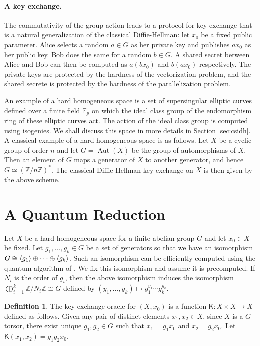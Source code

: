 \documentclass[11pt]{article}
\theoremstyle{plain}
\theoremstyle{definition}
\newtheorem{definition}[theorem]{Definition}
\DeclareMathOperator{\aut}{Aut}
\DeclarePairedDelimiter{\lrang}{\langle}{\rangle}
\def\Z{\mathbb{Z}}
\def\F{\mathbb{F}}
\newcommand{\kex}{\mathsf{K}}
\begin{document}
\paragraph{A key exchange.}
The commutativity of the group action leads to a protocol for key exchange that is a natural 
generalization of the classical Diffie-Hellman: let $x_0$ be a fixed public parameter. Alice selects 
a random $a \in G$ as her private key and publishes $ax_0$ as her public key. Bob does the same for 
a random $b \in G$. A shared secret between Alice and Bob can then be computed as $a(bx_0)$ and 
$b(ax_0)$ respectively. The private keys are protected by the hardness of the vectorization problem, 
and the shared secrete is protected by the hardness of the parallelization problem. 

An example of a hard homogeneous space is a set of supersingular elliptic curves defined over a 
finite field $\F_p$ on which the ideal class group of the endomorphism ring of these elliptic curves 
act. The action of the ideal class group is computed using isogenies. We shall discuss this space in 
more details in Section \ref{sec:csidh}. A classical example of a hard homogeneous space is as 
follows. Let $X$ be a cyclic group of order $n$ and let $G = \aut(X)$ be the group of automorphisms 
of $X$. Then an element of $G$ maps a generator of $X$ to another generator, and hence $G \simeq (\Z 
/ n\Z)^*$. The classical Diffie-Hellman key exchange on $X$ is then given by the above scheme.





\section{A Quantum Reduction}

Let $X$ be a hard homogeneous space for a finite abelian group $G$ and let $x_0 \in X$ be fixed. Let 
$g_1, \dots, g_k \in G$ be a set of generators so that we have an isomorphism $G \cong \lrang{g_1} 
\oplus \cdots \oplus \lrang{g_k}$. Such an isomorphism can be efficiently computed using the quantum
algorithm of \cite{cheung2001decomposing}. We fix this isomorphism and assume it is precomputed. If 
$N_i$ is the order of $g_i$, then the above isomorphism induces the isomorphism $\bigoplus_{i = 1}^k 
\Z / N_i \Z \cong G$ defined by $(y_1, \dots, y_k) \mapsto g_1^{y_1} \cdots g_k^{y_k}$.

\begin{definition}
	The key exchange oracle for $(X, x_0)$ is a function $\kex: X \times X \rightarrow X$ defined as 
	follows. Given any pair of distinct elements $x_1, x_2 \in X$, since $X$ is a $G$-torsor, there 
	exist unique $g_1, g_2 \in G$ such that $x_1 = g_1x_0$ and $x_2 = g_2x_0$. Let $\kex(x_1, x_2) = 
	g_1g_2x_0$.
\end{definition}
\end{document}
